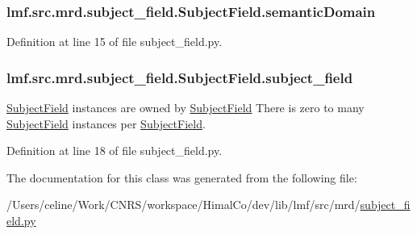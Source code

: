 \hypertarget{classlmf_1_1src_1_1mrd_1_1subject__field_1_1_subject_field_aa625fa1b644690d878091eaa4ea9460f}{
\subsubsection[{semantic\+Domain}]{\setlength{\rightskip}{0pt plus 5cm}lmf.\+src.\+mrd.\+subject\+\_\+field.\+Subject\+Field.\+semantic\+Domain}}\label{classlmf_1_1src_1_1mrd_1_1subject__field_1_1_subject_field_aa625fa1b644690d878091eaa4ea9460f}


Definition at line 15 of file subject\+\_\+field.\+py.

\hypertarget{classlmf_1_1src_1_1mrd_1_1subject__field_1_1_subject_field_ae43454d43d98b42b780661e8b18f89d4}{
\subsubsection[{subject\+\_\+field}]{\setlength{\rightskip}{0pt plus 5cm}lmf.\+src.\+mrd.\+subject\+\_\+field.\+Subject\+Field.\+subject\+\_\+field}}\label{classlmf_1_1src_1_1mrd_1_1subject__field_1_1_subject_field_ae43454d43d98b42b780661e8b18f89d4}


\hyperlink{classlmf_1_1src_1_1mrd_1_1subject__field_1_1_subject_field}{Subject\+Field} instances are owned by \hyperlink{classlmf_1_1src_1_1mrd_1_1subject__field_1_1_subject_field}{Subject\+Field} There is zero to many \hyperlink{classlmf_1_1src_1_1mrd_1_1subject__field_1_1_subject_field}{Subject\+Field} instances per \hyperlink{classlmf_1_1src_1_1mrd_1_1subject__field_1_1_subject_field}{Subject\+Field}. 



Definition at line 18 of file subject\+\_\+field.\+py.



The documentation for this class was generated from the following file\+:\begin{DoxyCompactItemize}
\item 
/\+Users/celine/\+Work/\+C\+N\+R\+S/workspace/\+Himal\+Co/dev/lib/lmf/src/mrd/\hyperlink{subject__field_8py}{subject\+\_\+field.\+py}\end{DoxyCompactItemize}
